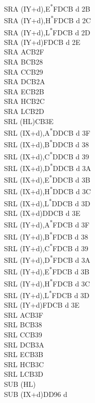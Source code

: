 \documentclass[twoside,openright,a4paper]{book}
\begin{document}
\begin{multicols}{3}
{\begin{tabbing}
	SRA (IY+d),E\textsuperscript{*}\>FDCB d 2B\\
	SRA (IY+d),H\textsuperscript{*}\>FDCB d 2C\\
	SRA (IY+d),L\textsuperscript{*}\>FDCB d 2D\\
	SRA (IY+d)\>FDCB d 2E\\
	SRA A\>CB2F\\
	SRA B\>CB28\\
	SRA C\>CB29\\
	SRA D\>CB2A\\
	SRA E\>CB2B\\
	SRA H\>CB2C\\
	SRA L\>CB2D\\
	SRL (HL)\>CB3E\\
	SRL (IX+d),A\textsuperscript{*}\>DDCB d 3F\\
	SRL (IX+d),B\textsuperscript{*}\>DDCB d 38\\
	SRL (IX+d),C\textsuperscript{*}\>DDCB d 39\\
	SRL (IX+d),D\textsuperscript{*}\>DDCB d 3A\\
	SRL (IX+d),E\textsuperscript{*}\>DDCB d 3B\\
	SRL (IX+d),H\textsuperscript{*}\>DDCB d 3C\\
	SRL (IX+d),L\textsuperscript{*}\>DDCB d 3D\\
	SRL (IX+d)\>DDCB d 3E\\
	SRL (IY+d),A\textsuperscript{*}\>FDCB d 3F\\
	SRL (IY+d),B\textsuperscript{*}\>FDCB d 38\\
	SRL (IY+d),C\textsuperscript{*}\>FDCB d 39\\
	SRL (IY+d),D\textsuperscript{*}\>FDCB d 3A\\
	SRL (IY+d),E\textsuperscript{*}\>FDCB d 3B\\
	SRL (IY+d),H\textsuperscript{*}\>FDCB d 3C\\
	SRL (IY+d),L\textsuperscript{*}\>FDCB d 3D\\
	SRL (IY+d)\>FDCB d 3E\\
	SRL A\>CB3F\\
	SRL B\>CB38\\
	SRL C\>CB39\\
	SRL D\>CB3A\\
	SRL E\>CB3B\\
	SRL H\>CB3C\\
	SRL L\>CB3D\\
	SUB (HL)\\
	SUB (IX+d)\>DD96 d\\

\end{tabbing}}
\end{multicols}
\end{document}
